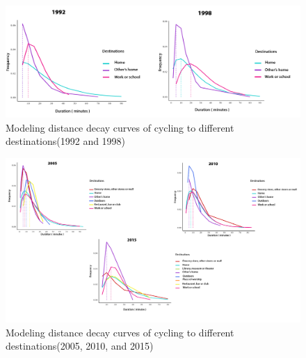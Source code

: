 \documentclass[12pt,twoside]{reedthesis}
\begin{document}
\newpage
\thispagestyle{empty}
\begin{landscape}
\begin{figure}

{\centering \includegraphics[width=0.9\linewidth]{imped_cycling} 

}

\caption{Modeling distance decay curves of cycling to different destinations(1992 and 1998)}\label{fig:imp-c1}
\end{figure}
\begin{figure}

{\centering \includegraphics[width=0.9\linewidth]{imped_cycling_2} 

}

\caption{Modeling distance decay curves of cycling to different destinations(2005, 2010, and 2015)}\label{fig:imp-c2}
\end{figure}
\end{landscape}
\clearpage
\end{document}
